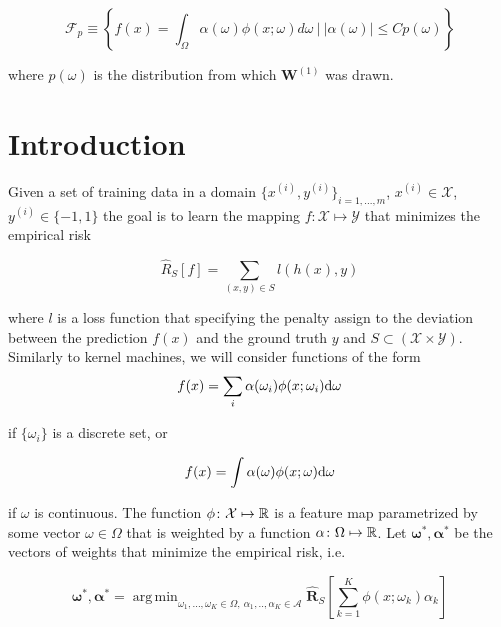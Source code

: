 \documentclass{article}
\DeclareMathOperator*{\argmin}{arg\,min}
\begin{document}
    \begin{equation}
        \mathcal{F}_p \equiv  
        \left\{f(x) = \int_\Omega \alpha(\omega)\phi(x; \omega) d\omega ~\big |~
        |\alpha(\omega)| \leq C p(\omega) \right\}
    \end{equation}
    
    where $p(\omega)$ is the distribution from which $\mathbf{W}^{(1)}$ was drawn.
    
    \section{Introduction}
    
    Given a set of training data in a domain $\{x^{(i)}, y^{(i)}\}_{i=1,...,m}$, $x^{(i)}\in \mathcal{X}$, $y^{(i)}\in \{-1, 1\}$ the goal is to learn the mapping $f\colon \mathcal{X} \mapsto \mathcal{Y}$ that minimizes the empirical risk
    
    \begin{equation}
        \hat{R}_S[f] = \sum_{(x, y)\in S} l\left(h(x), y\right)
    \end{equation}
    
    where $l$ is a loss function that specifying the penalty assign to the deviation between the prediction $f(x)$ and the ground truth $y$ and $S \subset (\mathcal{X} \times \mathcal{Y})$.\\
    
    Similarly to kernel machines, we will consider functions of the form
    \begin{equation}
        f(x) = \sum_i \alpha(\omega_i)\phi(x;\omega_i)\mathrm{d} \omega
    \end{equation}
    
    if $\{\omega_i\}$ is a discrete set, or
    
    \begin{equation}
        f(x) = \int \alpha(\omega)\phi(x;\omega)\mathrm{d} \omega
    \end{equation}
    
    if $\omega$ is continuous. The function $\phi\colon \mathcal{X}\mapsto \mathbb{R}$ is a feature map parametrized by some vector $\omega\in \Omega$ that is weighted by a function $\alpha\colon \Omega\mapsto \mathbb{R}$.  Let $\bm{\omega}^*, \bm{\alpha}^*$ be the vectors of weights that minimize the empirical risk, i.e.

    \begin{equation}
        \bm{\omega}^*, \bm{\alpha}^* =
        \argmin_{\omega_1,...,\omega_K \in \Omega,~\alpha_1,..,\alpha_K \in \mathcal{A}}
        \hat{\mathbf{R}}_S  \left[\sum_{k=1}^K \phi(x; \omega_k)\alpha_k\right]
    \end{equation}
    
\end{document}
